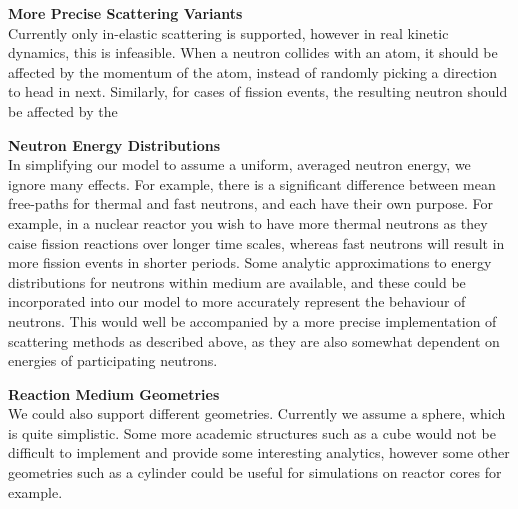 \noindent\textbf{More Precise Scattering Variants} \\
Currently only in-elastic scattering is supported, however in real kinetic dynamics, this is infeasible. When a neutron collides 
with an atom, it should be affected by the momentum of the atom, instead of randomly picking a direction to head in next. Similarly, 
for cases of fission events, the resulting neutron should be affected by the 

\noindent\textbf{Neutron Energy Distributions} \\
In simplifying our model to assume a uniform, averaged neutron energy, we ignore many effects. For example, there is a significant difference 
between mean free-paths for thermal and fast neutrons, and each have their own purpose. For example, in a nuclear reactor you wish to have 
more thermal neutrons as they caise fission reactions over longer time scales, whereas fast neutrons will result in more fission events 
in shorter periods. Some analytic approximations to energy distributions for neutrons within medium are available, and these could be incorporated 
into our model to more accurately represent the behaviour of neutrons. This would well be accompanied by a more precise implementation 
of scattering methods as described above, as they are also somewhat dependent on energies of participating neutrons.

\noindent\textbf{Reaction Medium Geometries} \\
We could also support different geometries. Currently we assume a sphere, which is quite simplistic. Some more academic 
structures such as a cube would not be difficult to implement and provide some interesting analytics, however some 
other geometries such as a cylinder could be useful for simulations on reactor cores for example.
